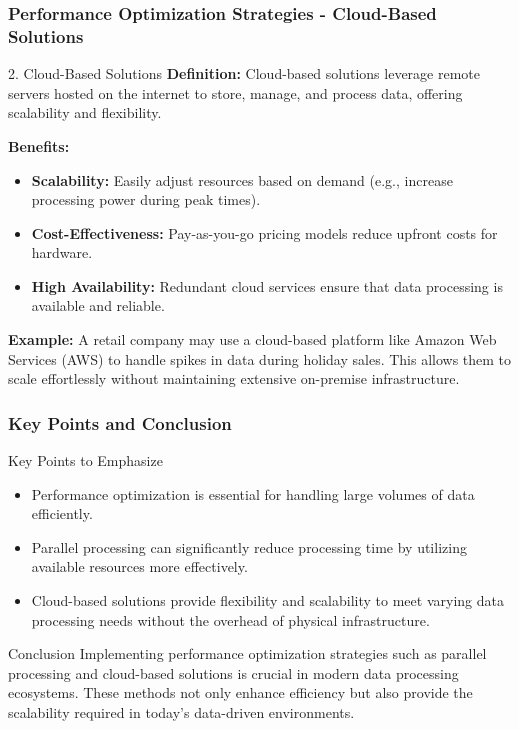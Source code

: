 \documentclass[aspectratio=169]{beamer}
\begin{document}
\begin{frame}[fragile]
    \frametitle{Performance Optimization Strategies - Cloud-Based Solutions}
    \begin{block}{2. Cloud-Based Solutions}
        \textbf{Definition:} Cloud-based solutions leverage remote servers hosted on the internet to store, manage, and process data, offering scalability and flexibility.

        \textbf{Benefits:}
        \begin{itemize}
            \item \textbf{Scalability:} Easily adjust resources based on demand (e.g., increase processing power during peak times).
            \item \textbf{Cost-Effectiveness:} Pay-as-you-go pricing models reduce upfront costs for hardware.
            \item \textbf{High Availability:} Redundant cloud services ensure that data processing is available and reliable.
        \end{itemize}

        \textbf{Example:} A retail company may use a cloud-based platform like Amazon Web Services (AWS) to handle spikes in data during holiday sales. This allows them to scale effortlessly without maintaining extensive on-premise infrastructure.
    \end{block}
\end{frame}

\begin{frame}[fragile]
    \frametitle{Key Points and Conclusion}
    \begin{block}{Key Points to Emphasize}
        \begin{itemize}
            \item Performance optimization is essential for handling large volumes of data efficiently.
            \item Parallel processing can significantly reduce processing time by utilizing available resources more effectively.
            \item Cloud-based solutions provide flexibility and scalability to meet varying data processing needs without the overhead of physical infrastructure.
        \end{itemize}
    \end{block}

    \begin{block}{Conclusion}
        Implementing performance optimization strategies such as parallel processing and cloud-based solutions is crucial in modern data processing ecosystems. These methods not only enhance efficiency but also provide the scalability required in today's data-driven environments.
    \end{block}
\end{frame}
\end{document}
